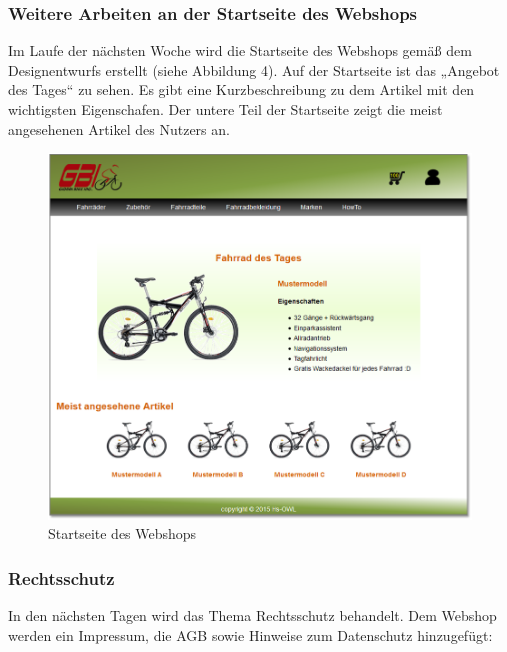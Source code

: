 \subsubsection{Weitere Arbeiten an der Startseite des Webshops}

Im Laufe der nächsten Woche wird die Startseite des Webshops gemäß dem Designentwurfs erstellt (siehe Abbildung 4). Auf der Startseite ist das „Angebot des Tages“ zu sehen. Es gibt eine Kurzbeschreibung zu dem Artikel mit den wichtigsten Eigenschafen. Der untere Teil der Startseite zeigt die meist angesehenen Artikel des Nutzers an. 

\begin{figure}[H]
\begin{center}

\includegraphics[width=150mm]{Bilder/Abbildung5-StartseiteDesWebshops.png}
\end{center}
\caption{Startseite des Webshops}
\label{Abbildung5-Startseite des Webshops}
\end{figure}


\subsubsection{Rechtsschutz}

In den nächsten Tagen wird das Thema Rechtsschutz behandelt. Dem Webshop werden ein Impressum, die AGB sowie Hinweise zum Datenschutz hinzugefügt:

